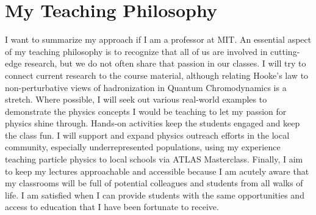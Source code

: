 \documentclass[10pt,a4paper,sans]{moderncv} %
\begin{document}
\section{My Teaching Philosophy}
I want to summarize my approach if I am a professor at MIT. An essential aspect of my teaching philosophy is to recognize that all of us are involved in cutting-edge research, but we do not often share that passion in our classes. I will try to connect current research to the course material, although relating Hooke's law to non-perturbative views of hadronization in Quantum Chromodynamics is a stretch. Where possible, I will seek out various real-world examples to demonstrate the physics concepts I would be teaching to let my passion for physics shine through. Hands-on activities keep the students engaged and keep the class fun. I will support and expand physics outreach efforts in the local community, especially underrepresented populations, using my experience teaching particle physics to local schools via ATLAS Masterclass. Finally, I aim to keep my lectures approachable and accessible because I am acutely aware that my classrooms will be full of potential colleagues and students from all walks of life. I am satisfied when I can provide students with the same opportunities and access to education that I have been fortunate to receive.

\printbibliography
\end{document}
